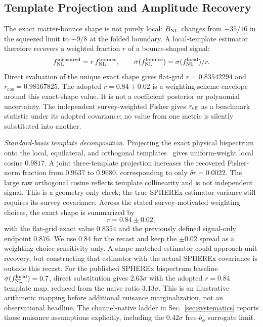 \documentclass[aps,prd,twocolumn,superscriptaddress,showpacs,preprintnumbers,nofootinbib,longbibliography,floatfix]{revtex4-2}
\newcommand{\fnl}{f_{\rm NL}}
\newcommand{\BNL}{B_{\rm NL}}
\begin{document}
\subsection{Template Projection and Amplitude Recovery}
\label{sec:template}

The exact matter-bounce shape is not purely local: $\BNL$ changes from $-35/16$ in the squeezed limit to $-9/8$ at the folded boundary. A local-template estimator therefore recovers a weighted fraction $r$ of a bounce-shaped signal:
\begin{equation}
\fnl^{\rm measured}=r\,\fnl^{\rm bounce},\qquad
\sigma(\fnl^{\rm bounce})=\sigma(\fnl^{\rm local})/r .
\label{eq:projection}
\end{equation}
Direct evaluation of the unique exact shape gives flat-grid $r=0.83542294$ and $r_{\cos}=0.98167825$. The adopted $r=0.84\pm0.02$ is a weighting-scheme envelope around this exact-shape value. It is not a coefficient posterior or polynomial uncertainty. The independent survey-weighted Fisher gives $r_{\rm eff}$ as a benchmark statistic under its adopted covariance; no value from one metric is silently substituted into another.
\par \emph{Standard-basis template decomposition.} Projecting the exact physical bispectrum onto the local, equilateral, and orthogonal templates~\cite{Senatore:2010} gives uniform-weight local cosine $0.9817$. A joint three-template projection increases the recovered Fisher-norm fraction from $0.9637$ to $0.9680$, corresponding to only $\delta r=0.0022$. The large raw orthogonal cosine reflects template collinearity and is not independent signal. This is a geometry-only check; the true SPHEREx estimator variance still requires its survey covariance.
Across the stated survey-motivated weighting choices, the exact shape is summarized by
\begin{equation}
r=0.84\pm0.02 ,
\label{eq:r_noise}
\end{equation}
with the flat-grid exact value $0.8354$ and the previously defined signal-only endpoint $0.876$. We use $0.84$ for the recast and keep the $\pm0.02$ spread as a weighting-choice sensitivity only. A shape-matched estimator could approach unit recovery, but constructing that estimator with the actual SPHEREx covariance is outside this recast.
For the published SPHEREx bispectrum baseline $\sigma(\fnl^{\rm local})=0.7$, direct substitution gives $2.63\sigma$ with the adopted $r=0.84$ template map, reduced from the naive ratio $3.13\sigma$. This is an illustrative arithmetic mapping before additional nuisance marginalization, not an observational headline. The channel-native ladder in Sec.~\ref{sec:systematics} reports those nuisance assumptions explicitly, including the $0.42\sigma$ free-$b_\phi$ surrogate limit.
\end{document}
